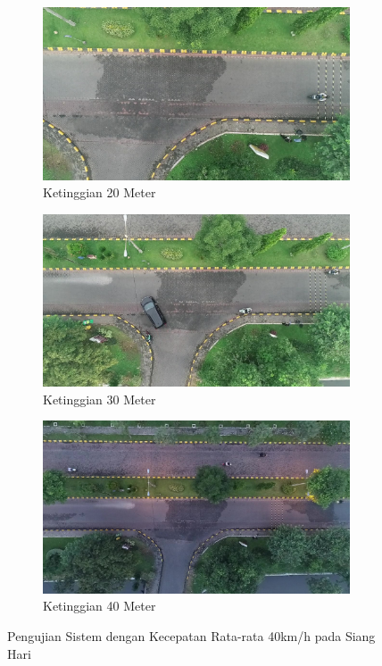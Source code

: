 \begin{figure}[H]
  \centering
  \begin{subfigure}[b]{0.45\textwidth}
    \centering
    \includegraphics[width=\linewidth]{bab4/20m_siang_40km.jpg}
    \caption{Ketinggian 20 Meter}
    \label{fig:20m_siang_40kmh}
  \end{subfigure}%
  \hfill
  \begin{subfigure}[b]{0.45\textwidth}
    \centering
    \includegraphics[width=\linewidth]{bab4/30m_siang_40km.jpg}
    \caption{Ketinggian 30 Meter}
    \label{fig:30m_siang_40kmh}
  \end{subfigure}%
  \hfill
  \begin{subfigure}[b]{0.45\textwidth}
    \centering
    \includegraphics[width=\linewidth]{bab4/40m_siang_40km.jpg}
    \caption{Ketinggian 40 Meter}
    \label{fig:40m_siang_40kmh}
  \end{subfigure}
  \caption{Pengujian Sistem dengan Kecepatan Rata-rata 40km/h pada Siang Hari}
  \label{fig:uji20m_40kmh}
\end{figure}

